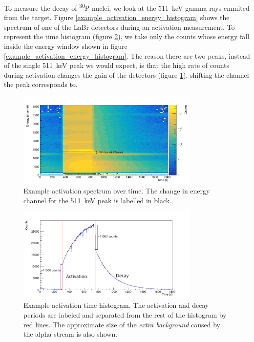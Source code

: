 \documentclass[a4paper,12pt]{report}
\newcommand{\Piso}{\textsuperscript{30}P }
\begin{document}
To measure the decay of \Piso nuclei, we look at the \qty{511}{\keV} gamma rays emmited from the target.
Figure \ref{example_activation_energy_histogram} shows the spectrum of one of the LaBr detectors during an activation measurement.
To represent the time histogram (figure \ref{example_activation_time_histogram}), we take only the counts whose energy fall inside the energy window shown in figure \ref{example_activation_energy_histogram}.
The reason there are two peaks, instead of the single \qty{511}{\keV} peak we would expect, is that the high rate of counts during activation changes the gain of the detectors (figure \ref{example_activation_energytime}), shifting the channel the peak corresponds to.

\begin{figure}[H]
	\centering
	\includegraphics[width=0.80\textwidth]{example_activation_energytime.png}
	\caption{Example activation spectrum over time.
	The change in energy channel for the \qty{511}{\keV} peak is labelled in black.}
	\label{example_activation_energytime}
\end{figure}

\begin{figure}[H]
	\centering
	\includegraphics[width=0.80\textwidth]{example_activation_time_histogram.png}
	\caption{Example activation time histogram.
	The activation and decay periods are labeled and separated from the rest of the histogram by red lines.
	The approximate size of the \textit{extra background} caused by the alpha stream is also shown.}
	\label{example_activation_time_histogram}
\end{figure}
\end{document}
